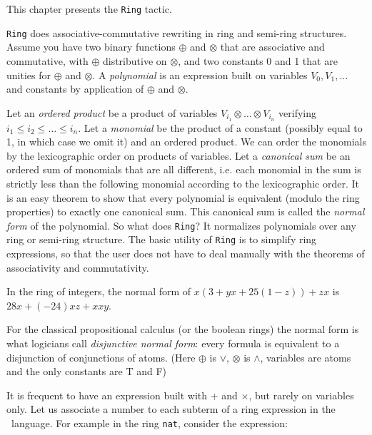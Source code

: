 \label{ring}

This chapter presents  the \texttt{Ring} tactic.


\texttt{Ring} does associative-commutative rewriting in ring and semi-ring
structures. Assume you have two binary functions $\oplus$ and $\otimes$
that are associative and commutative, with $\oplus$ distributive on
$\otimes$, and two constants 0 and 1 that are unities for $\oplus$ and
$\otimes$. A \textit{polynomial} is an expression built on variables $V_0, V_1,
\dots$ and constants by application of $\oplus$ and $\otimes$.

Let an {\it ordered product} be a product of variables $V_{i_1} \otimes
\ldots \otimes V_{i_n}$ verifying $i_1 \le i_2 \le \dots \le i_n$. Let a
\textit{monomial} be the product of a constant (possibly equal to 1, in
which case we omit it) and an ordered product.  We can order the
monomials by the lexicographic order on products of variables. Let a
\textit{canonical sum} be an ordered sum of monomials that are all
different, i.e. each monomial in the sum is strictly less than the
following monomial according to the lexicographic order. It is an easy
theorem to show that every polynomial is equivalent (modulo the ring
properties) to exactly one canonical sum. This canonical sum is called
the \textit{normal form} of the polynomial. So what does \texttt{Ring}? It
normalizes polynomials over any ring or semi-ring structure. The basic
utility of \texttt{Ring} is to simplify ring expressions, so that the user
does not have to deal manually with the theorems of associativity and
commutativity.

\begin{Examples}
\item In the ring of integers, the normal form of 
$x (3 + yx + 25(1 - z)) + zx$ is $28x + (-24)xz + xxy$.
\item For the classical propositional calculus (or the boolean rings)
  the normal form is what logicians call \textit{disjunctive normal
    form}: every formula is equivalent to a disjunction of
  conjunctions of atoms. (Here $\oplus$ is $\vee$, $\otimes$ is
  $\wedge$, variables are atoms and the only constants are T and F)
\end{Examples}


It is frequent to have an expression built with + and
  $\times$, but rarely on variables only.
Let us associate a number to each subterm of a ring
expression in the \gallina\ language. For example in the ring
\texttt{nat}, consider the expression:

